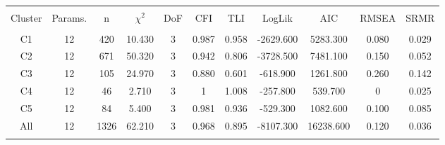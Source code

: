 
\begin{table}[!htbp] \centering 
  \caption{} 
  \label{struc_model_fit_clust_stats} 
\begin{tabular}{@{\extracolsep{0pt}} ccccccccccc} 
\\[-1.8ex]\hline 
\hline \\[-1.8ex] 
{Cluster} & {Params.} & {n} & {$\chi^{2}$} & {DoF} & {CFI} & {TLI} & {LogLik} & {AIC} & {RMSEA} & {SRMR} \\
\hline \\[-1.8ex] 
C1 & 12 & 420 & 10.430 & 3 & 0.987 & 0.958 & -2629.600 & 5283.300 & 0.080 & 0.029 \\ 
C2 & 12 & 671 & 50.320 & 3 & 0.942 & 0.806 & -3728.500 & 7481.100 & 0.150 & 0.052 \\ 
C3 & 12 & 105 & 24.970 & 3 & 0.880 & 0.601 & -618.900 & 1261.800 & 0.260 & 0.142 \\ 
C4 & 12 & 46 & 2.710 & 3 & 1 & 1.008 & -257.800 & 539.700 & 0 & 0.025 \\ 
C5 & 12 & 84 & 5.400 & 3 & 0.981 & 0.936 & -529.300 & 1082.600 & 0.100 & 0.085 \\ 
All & 12 & 1326 & 62.210 & 3 & 0.968 & 0.895 & -8107.300 & 16238.600 & 0.120 & 0.036 \\ 
\hline \\[-1.8ex] 
\end{tabular} 
\end{table} 
